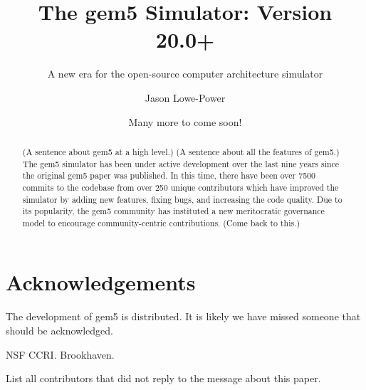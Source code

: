 \documentclass[manuscript, review, screen, timestamp]{acmart}
\begin{document}
\title{The gem5 Simulator: Version 20.0+}
\subtitle{A new era for the open-source computer architecture simulator}

\author{Jason Lowe-Power}
\author{Many more to come soon!}

%



\begin{abstract}
    (A sentence about gem5 at a high level.)
    (A sentence about all the features of gem5.)
    The gem5 simulator has been under active development over the last nine years since the original gem5 paper was published.
    In this time, there have been over 7500 commits to the codebase from over 250 unique contributors which have improved the simulator by adding new features, fixing bugs, and increasing the code quality.
    Due to its popularity, the gem5 community has instituted a new meritocratic governance model to encourage community-centric contributions.
    (Come back to this.)
\end{abstract}

\maketitle
\renewcommand{\shortauthors}{Lowe-Power and the gem5 Community}





\section{Acknowledgements}

The development of gem5 is distributed.
It is likely we have missed someone that should be acknowledged.

NSF CCRI. Brookhaven.

List all contributors that did not reply to the message about this paper.



\end{document}

